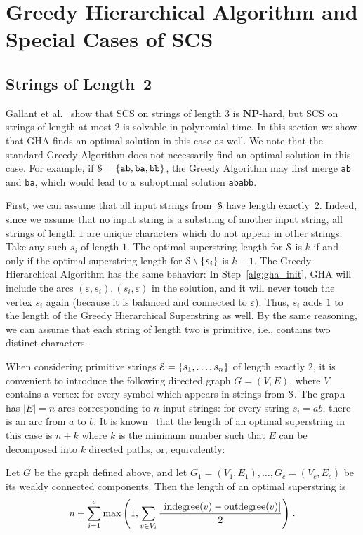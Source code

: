 \section{Greedy Hierarchical Algorithm and Special Cases of SCS}
\subsection{Strings of Length~2}\label{sec:ghatwo}
Gallant et al.~\cite{GMS1980} show that SCS on strings of length $3$ is $\mathbf{NP}$-hard, but SCS on strings of length at most $2$ is solvable in polynomial time. In this section we show that GHA finds an optimal solution in this case as well. We note that the standard Greedy Algorithm does not necessarily find an optimal solution in this case. For example, if ${\cal S}=\{{\tt ab}, {\tt ba}, {\tt bb}\}$, the Greedy Algorithm may first merge {\tt ab} and {\tt ba}, which would lead to a~suboptimal solution {\tt ababb}. 

First, we can assume that all input strings from~${\cal S}$ have length exactly~$2$. Indeed, since we assume that no input string is a substring of another input string, all strings of length $1$ are unique characters which do not appear in other strings. Take any such $s_i$ of length $1$. The optimal superstring length for ${\cal S}$ is $k$ if and only if the optimal superstring length for ${\cal S}\setminus\{s_i\}$ is $k-1$. The Greedy Hierarchical Algorithm has the same behavior: In Step~\ref{alg:gha_init}, GHA will include the arcs $(\varepsilon, s_i), (s_i, \varepsilon)$ in the solution, and it will never touch the vertex $s_i$ again (because it is balanced and connected to $\varepsilon$). Thus, $s_i$ adds $1$ to the length of the Greedy Hierarchical Superstring as well. By the same reasoning, we can assume that each string of length two is primitive, i.e., contains two distinct characters.

When considering primitive strings ${\cal S}=\{s_1,\ldots,s_n\}$ of length exactly $2$, it is convenient to introduce the following directed graph $G=(V, E)$, where $V$ contains a vertex for every symbol which appears in strings from ${\cal S}$. The graph has $|E|=n$ arcs corresponding to $n$ input strings: for every string $s_i=ab$, there is an arc from $a$ to $b$. It is known~\cite{GMS1980} that the length of an optimal superstring in this case is $n+k$ where $k$ is the minimum number such that $E$ can be decomposed into $k$ directed paths, or, equivalently:
\begin{proposition}
Let $G$ be the graph defined above, and let $G_1=(V_1,E_1),\ldots,G_c=(V_c,E_c)$ be its weakly connected components. Then the length of an optimal superstring is
\begin{align}
\label{eq:gms}
n + \sum_{i=1}^{c} {\max\left( 1, \sum_{v \in V_i}{ \frac{ |\operatorname{indegree}(v) - \operatorname{outdegree}(v)|}{2} }\right)} \; .
\end{align}
\end{proposition}

